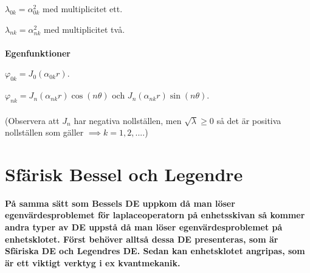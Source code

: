\documentclass{article}
\begin{document}
$\lambda_{0k}=\alpha_{0k}^2$ med multiplicitet ett.

$\lambda_{nk}=\alpha_{nk}^2$ med multiplicitet två.\\ \\
\textbf{Egenfunktioner}

$\varphi_{0k}=J_0(\alpha_{0k}r)$.

$\varphi_{nk}=J_n(\alpha_{nk}r)\cos(n\theta)$ och $J_n(\alpha_{nk}r)\sin(n\theta)$.\\ \\
(Observera att $J_n$ har negativa nollställen, men $\sqrt{\lambda}\geq0$ så  det är positiva nollställen som gäller $\implies k=1,2,...$.)

\section{Sfärisk Bessel och Legendre}
\textbf{På samma sätt som Bessels DE uppkom då man löser egenvärdesproblemet för laplaceoperatorn på enhetsskivan så kommer andra typer av DE uppstå då man löser egenvärdesproblemet på enhetsklotet. Först behöver alltså dessa DE presenteras, som är Sfäriska DE och Legendres DE. Sedan kan enhetsklotet angripas, som är ett viktigt verktyg i ex kvantmekanik.}
\end{document}
